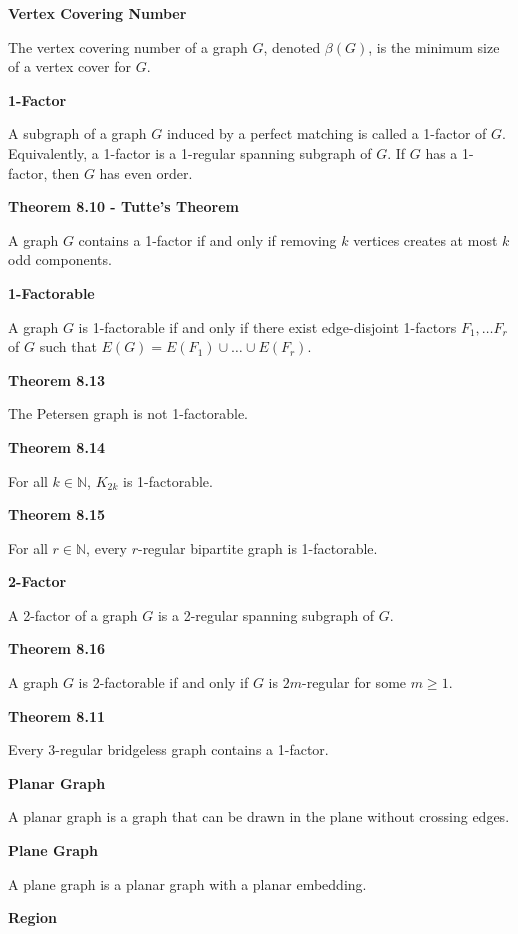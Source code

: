 \documentclass{article}
\begin{document}
\medskip\noindent\textbf{Vertex Covering Number}

	The vertex covering number of a graph $G$, denoted $\beta(G)$, is the minimum size of a vertex cover for $G$.

\medskip\noindent\textbf{1-Factor}

	A subgraph of a graph $G$ induced by a perfect matching is called a 1-factor of $G$.
	Equivalently, a 1-factor is a 1-regular spanning subgraph of $G$.
	If $G$ has a 1-factor, then $G$ has even order.

\medskip\noindent\textbf{Theorem 8.10 - Tutte's Theorem}

	A graph $G$ contains a 1-factor if and only if removing $k$ vertices creates at most $k$ odd components.

\medskip\noindent\textbf{1-Factorable}

    A graph $G$ is 1-factorable if and only if there exist edge-disjoint 1-factors $F_1, \hdots F_r$ of $G$ such that $E(G) = E(F_1) \cup \hdots \cup E(F_r)$.

\medskip\noindent\textbf{Theorem 8.13}

    The Petersen graph is not 1-factorable.

\medskip\noindent\textbf{Theorem 8.14}

    For all $k \in \mathbb N$, $K_{2k}$ is 1-factorable.

\medskip\noindent\textbf{Theorem 8.15}
    
    For all $r \in \mathbb N$, every $r$-regular bipartite graph is 1-factorable.

\medskip\noindent\textbf{2-Factor}

    A 2-factor of a graph $G$ is a 2-regular spanning subgraph of $G$.

\medskip\noindent\textbf{Theorem 8.16}

    A graph $G$ is 2-factorable if and only if $G$ is $2m$-regular for some $m \geq 1$.

\medskip\noindent\textbf{Theorem 8.11}

	Every 3-regular bridgeless graph contains a 1-factor.

\medskip\noindent\textbf{Planar Graph}

    A planar graph is a graph that can be drawn in the plane without crossing edges.

\medskip\noindent\textbf{Plane Graph}

    A plane graph is a planar graph with a planar embedding.

\medskip\noindent\textbf{Region}
\end{document}
